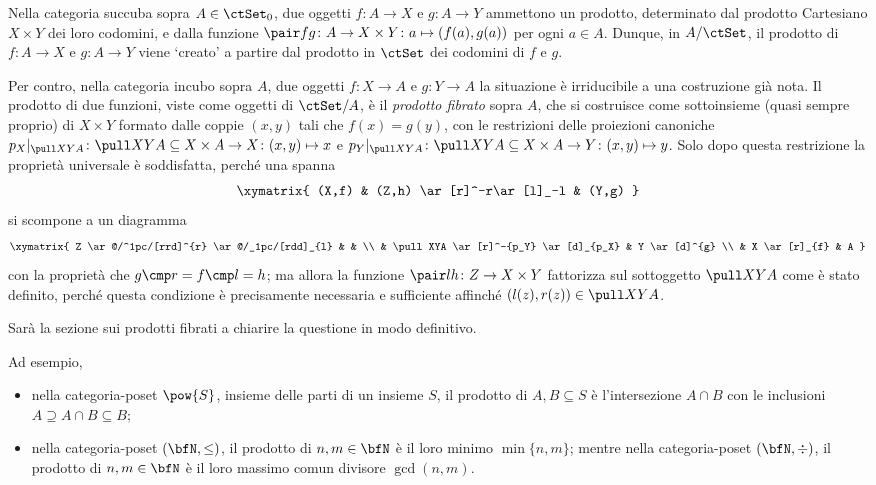 \begin{example}
	Nella categoria succuba sopra \(A\in\ctSet_0\), due oggetti \(f	\colon A\to X\) e \(g \colon A\to Y\) ammettono un prodotto, determinato dal prodotto Cartesiano \(X\times Y\) dei loro codomini, e dalla funzione \(\pair fg \colon A\to X\times Y\colon a \mapsto (f(a),g(a))\) per ogni \(a\in A\). Dunque, in \(A/\ctSet\), il prodotto di \(f \colon A\to X\) e \(g \colon A\to Y\) viene `creato' a partire dal prodotto in \(\ctSet\) dei codomini di \(f\) e \(g\).

	Per contro, nella categoria incubo sopra \(A\), due oggetti \(f \colon X\to A\) e \(g \colon Y\to A\) la situazione è irriducibile a una costruzione già nota. Il prodotto di due funzioni, viste come oggetti di \(\ctSet/A\), è il \emph{prodotto fibrato} sopra \(A\), che si costruisce come sottoinsieme (quasi sempre proprio) di \(X\times Y\) formato dalle coppie \((x,y)\) tali che \(f(x)=g(y)\), con le restrizioni delle proiezioni canoniche \(p_X|_{\pull XYA} \colon \pull XYA \subseteq X\times A\to X\colon (x,y)\mapsto x\) e \(p_Y|_{\pull XYA} \colon \pull XYA \subseteq X\times A\to Y\colon (x,y)\mapsto y\). Solo dopo questa restrizione la proprietà universale è soddisfatta, perché una spanna
	\[\xymatrix{
			(X,f) & (Z,h) \ar[r]^-r\ar[l]_-l & (Y,g)
		}\]
	si scompone a un diagramma
	\[
		\xymatrix{
		Z \ar@/^1pc/[rrd]^{r} \ar@/_1pc/[rdd]_{l} & & \\
		& \pull XYA \ar[r]^-{p_Y} \ar[d]_{p_X} & Y \ar[d]^{g} \\
		& X \ar[r]_{f} & A
		}
	\] con la proprietà che \(g\cmp r = f\cmp l=h\); ma allora la funzione \(\pair lh \colon Z\to X\times Y\) fattorizza sul sottoggetto \(\pull XYA\) come è stato definito, perché questa condizione è precisamente necessaria e sufficiente affinché \((l(z),r(z)) \in \pull XYA\).

	Sarà la sezione sui prodotti fibrati a chiarire la questione in modo definitivo.
\end{example}
\begin{example}
	\Todo{}
	Ad esempio,
	\begin{itemize}
		\item nella categoria-poset \(\pow{S}\), insieme delle parti di un insieme \(S\), il prodotto di \(A,B\subseteq S\) è l'intersezione \(A\cap B\) con le inclusioni \(A\supseteq A\cap B\subseteq B\);
		\item nella categoria-poset \((\bfN,\le)\), il prodotto di \(n,m\in\bfN\) è il loro minimo \(\min\{n,m\}\); mentre nella categoria-poset \((\bfN,\div)\), il prodotto di \(n,m\in\bfN\) è il loro massimo comun divisore \(\gcd(n,m)\).
	\end{itemize}
\end{example}
\begin{example}
	\Todo{}
\end{example}
\begin{example}
	\Todo{}
\end{example}
\Todo{}
